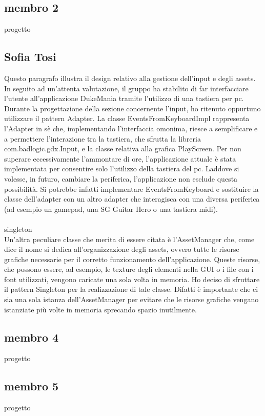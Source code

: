 \documentclass[a4paper,12pt]{report}
\begin{document}
\subsection{membro 2}
progetto 
\newpage
\subsection{Sofia Tosi}
Questo paragrafo illustra il design relativo alla gestione dell'input e degli assets.
In seguito ad un'attenta valutazione, il gruppo ha stabilito di far interfacciare l'utente all'applicazione DukeMania tramite l'utilizzo di
una tastiera per pc. 
Durante la progettazione della sezione concernente l'input, ho ritenuto oppurtuno utilizzare il pattern Adapter.
La classe EventsFromKeyboardImpl rappresenta l'Adapter in sè che, implementando l'interfaccia omonima, riesce a semplificare e a permettere l'interazione
tra la tastiera, che sfrutta la libreria com.badlogic.gdx.Input, e la classe relativa alla grafica PlayScreen.
Per non superare eccessivamente l'ammontare di ore, l'applicazione attuale è stata implementata per consentire solo l'utilizzo della tastiera del pc. 
Laddove si volesse, in futuro, cambiare la periferica, l'applicazione non esclude questa possibilità. Si potrebbe infatti implementare EventsFromKeyboard 
e sostituire la classe dell'adapter con un altro adapter che interagisca con una diversa periferica (ad esempio un gamepad, una SG Guitar Hero o una tastiera midi).
\\ \\
singleton \\
Un'altra peculiare classe che merita di essere citata è l'AssetManager che, come dice il nome si dedica all'organizzazione degli assets, ovvero tutte le risorse grafiche
necessarie per il corretto funzionamento dell'applicazione. Queste risorse, che possono essere, ad esempio, le texture degli elementi nella GUI o i file con i font utilizzati,
vengono caricate una sola volta in memoria.
Ho deciso di sfruttare il pattern Singleton per la realizzazione di tale classe. Difatti è importante che ci sia una sola istanza dell'AssetManager per evitare che le risorse 
grafiche vengano istanziate più volte in memoria sprecando spazio inutilmente. 
\newpage
\subsection{membro 4}
progetto 
\subsection{membro 5}
progetto 
\newpage
\end{document}
